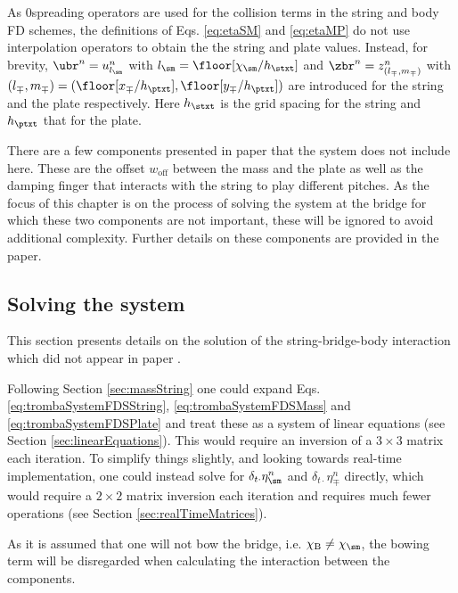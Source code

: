 As $0$\thOrder spreading operators are used for the collision terms in the string and body FD schemes, the definitions of Eqs. \eqref{eq:etaSM} and \eqref{eq:etaMP} do not use interpolation operators to obtain the the string and plate values. Instead, for brevity, $\ubr^n = u_{l_\sm}^n$ with $l_\sm = \floor[\chi_\sm / h_\stxt]$ and $\zbr^n = z_{(l_\mp, m_\mp)}^n$ with $(l_\mp, m_\mp) = (\floor[x_\mp / h_\ptxt], \floor[y_\mp / h_\ptxt])$ are introduced for the string and the plate respectively. Here $h_\stxt$ is the grid spacing for the string and $h_\ptxt$ that for the plate. 

There are a few components presented in paper \citeP[D] that the system does not include here. These are the offset $w_\text{off}$ between the mass and the plate as well as the damping finger that interacts with the string to play different pitches. As the focus of this chapter is on the process of solving the system at the bridge for which these two components are not important, these will be ignored to avoid additional complexity. Further details on these components are provided in the paper.

\subsection{Solving the system}
This section presents details on the solution of the string-bridge-body interaction which did not appear in paper \citeP[D].

Following Section \ref{sec:massString} one could expand Eqs. \eqref{eq:trombaSystemFDSString}, \eqref{eq:trombaSystemFDSMass} and \eqref{eq:trombaSystemFDSPlate} and treat these as a system of linear equations (see Section \ref{sec:linearEquations}). This would require an inversion of a $3\times 3$ matrix each iteration.
To simplify things slightly, and looking towards real-time implementation, one could instead solve for $\delta_{t\cdot}\eta_\sm^n$ and $\delta_{t\cdot}\eta_\mp^n$ directly, which would require a $2\times 2$ matrix inversion each iteration and requires much fewer operations (see Section \ref{sec:realTimeMatrices}).

As it is assumed that one will not bow the bridge, i.e. $\chi_\text{B} \neq \chi_\sm$, the bowing term will be disregarded when calculating the interaction between the components. 

